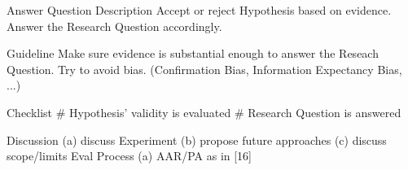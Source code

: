 Answer Question
	Description
		Accept or reject Hypothesis based on evidence.
		Answer the Research Question accordingly.
	
	Guideline
		Make sure evidence is substantial enough to answer the Reseach Question.
		Try to avoid bias. (Confirmation Bias, Information Expectancy Bias, ...)
		
	Checklist
		\# Hypothesis' validity is evaluated
		\# Research Question is answered
	
	
Discussion
(a) discuss Experiment
(b) propose future approaches
(c) discuss scope/limits
Eval Process
(a) AAR/PA as in [16]
	
	
	
	
	
	
	
	
	